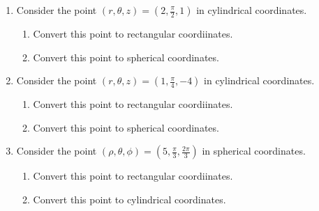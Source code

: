 \documentclass[12pt]{article}
\begin{document}
\begin{enumerate}

\item Consider the point $(r,\theta,z)=\left(2, \frac{\pi}{2}, 1\right)$ in cylindrical coordinates.

\begin{enumerate}

\item Convert this point to rectangular coordiinates.


\item Convert this point to spherical coordinates.


\end{enumerate}

\item Consider the point $(r,\theta,z)=\left(1, \frac{\pi}{4}, -4\right)$ in cylindrical coordinates.

\begin{enumerate}

\item Convert this point to rectangular coordiinates.


\item Convert this point to spherical coordinates.


\end{enumerate}

\newpage

\item Consider the point $(\rho,\theta,\phi)=\left(5, \frac{\pi}{3}, \frac{2\pi}{3}\right)$ in spherical coordinates.

\begin{enumerate}

\item Convert this point to rectangular coordiinates.


\item Convert this point to cylindrical coordinates.



\end{enumerate}
\end{enumerate}
\end{document}
